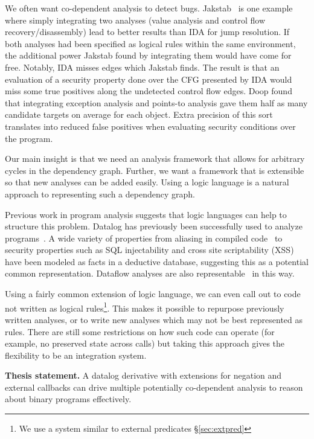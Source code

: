 We often want co-dependent analysis to detect bugs.
Jakstab~\cite{jakstab} is one example where simply integrating two analyses (value analysis and control flow recovery/disassembly) lead to better results than IDA\cite{ida} for jump resolution.
If both analyses had been specified as logical rules within the same environment, the additional power Jakstab found by integrating them would have come for free.
Notably, IDA misses edges which Jakstab finds.
The result is that an evaluation of a security property done over the CFG presented by IDA would miss some true positives along the undetected control flow edges.
Doop\cite{doop1} found that integrating exception analysis and points-to analysis gave them half as many candidate targets on average for each object.
Extra precision of this sort translates into reduced false positives when evaluating security conditions over the program.

Our main insight is that we need an analysis framework that allows for arbitrary cycles in the dependency graph.
Further, we want a framework that is extensible so that new analyses can be added easily.
Using a logic language is a natural approach to representing such a dependency graph.

Previous work in program analysis suggests that logic languages can help to structure this problem.
Datalog has previously been successfully used to analyze programs~\cite{lam2005,brumley2006,alpuente2011,doop1,bddbddb}.
A wide variety of properties from aliasing in compiled code~\cite{brumley2006} to security properties such as SQL injectability and cross site scriptability (XSS)~\cite{lam2005} have been modeled as facts in a deductive database, suggesting this as a potential common representation.
Dataflow analyses are also representable~\cite{mcallester2002} in this way.

Using a fairly common extension of logic language, we can even call out to code not written as logical rules\footnote{We use a system similar to external predicates \S\ref{sec:extpred}}.
This makes it possible to repurpose previously written analyses, or to write new analyses which may not be best represented as rules.
There are still some restrictions on how such code can operate (for example, no preserved state across calls) but taking this approach gives the flexibility to be an integration system.

\begin{inset}
{\bf Thesis statement.}
A datalog derivative with extensions for negation and external callbacks can drive multiple potentially co-dependent analysis to reason about binary programs effectively.
\end{inset}

